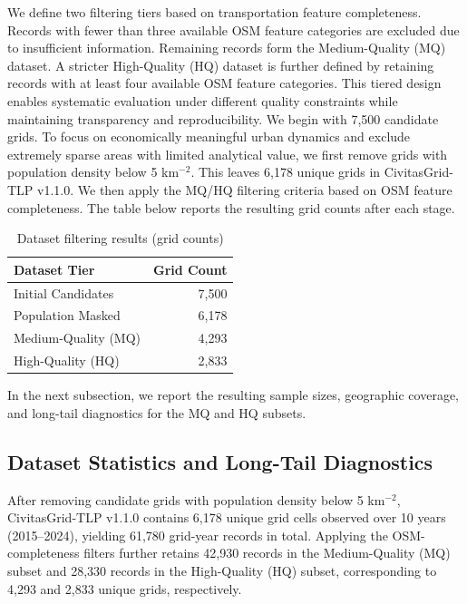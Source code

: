 \documentclass[pdflatex,sn-basic,Numbered]{sn-jnl}
\begin{document}
We define two filtering tiers based on transportation feature completeness. Records with fewer than three available OSM feature categories are excluded due to insufficient information. Remaining records form the Medium-Quality (MQ) dataset. A stricter High-Quality (HQ) dataset is further defined by retaining records with at least four available OSM feature categories. This tiered design enables systematic evaluation under different quality constraints while maintaining transparency and reproducibility. We begin with 7,500 candidate grids. To focus on economically meaningful urban dynamics and exclude extremely sparse areas with limited analytical value, we first remove grids with population density below 5 km$^{-2}$. This leaves 6,178 unique grids in CivitasGrid-TLP v1.1.0. We then apply the MQ/HQ filtering criteria based on OSM feature completeness. The table below reports the resulting grid counts after each stage.
\begin{table}[htbp]
    \centering
    \begin{tabular}{lr}
        \toprule
        \textbf{Dataset Tier} & \textbf{Grid Count}\\
        \midrule
        Initial Candidates & 7,500 \\
        Population Masked & 6,178 \\
        Medium-Quality (MQ) & 4,293 \\
        High-Quality (HQ) & 2,833 \\
        \bottomrule
    \end{tabular}
    \caption{Dataset filtering results (grid counts)}
    \label{tab:filtering}

\end{table}

In the next subsection, we report the resulting sample sizes, geographic coverage, and long-tail diagnostics for the MQ and HQ subsets.


\subsection{Dataset Statistics and Long-Tail Diagnostics}

After removing candidate grids with population density below 5 km$^{-2}$, CivitasGrid-TLP v1.1.0 contains 6,178 unique grid cells observed over 10 years (2015–2024), yielding 61,780 grid-year records in total. Applying the OSM-completeness filters further retains 42,930 records in the Medium-Quality (MQ) subset and 28,330 records in the High-Quality (HQ) subset, corresponding to 4,293 and 2,833 unique grids, respectively.
\end{document}
